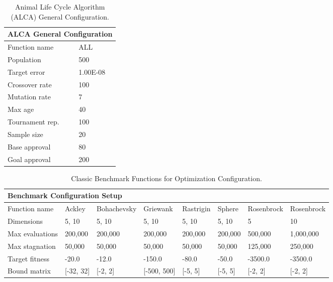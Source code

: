 \documentclass[graybox]{svmult}
\begin{document}
        \begin{table}[]
            \scriptsize
            \centering
            \caption{Animal Life Cycle Algorithm (ALCA) General Configuration.}\label{tab.general_configuration}
            \begin{tabular}{@{}ll@{}}
            \toprule
            \multicolumn{2}{l}{\textbf{ALCA General Configuration}} \\ \midrule
            Function name & ALL \\
            Population & 500 \\
            Target error & 1.00E-08 \\
            Crossover rate & 100 \\
            Mutation rate & 7 \\
            Max age & 40 \\
            Tournament rep. & 100 \\
            Sample size & 20 \\
            Base approval & 80 \\
            Goal approval & 200 \\ \bottomrule
            \end{tabular}
            \end{table}

        \begin{table}[]
            \scriptsize
            \centering
            \caption{Classic Benchmark Functions for Optimization Configuration.}\label{tab.benchmark_fun_config}
            \begin{tabular}{@{}llllllll@{}}
            \toprule
            \multicolumn{8}{l}{\textbf{Benchmark Configuration Setup}} \\ \midrule
            Function name & Ackley & Bohachevsky & Griewank & Rastrigin & Sphere & Rosenbrock & Rosenbrock \\
            Dimensions & 5, 10 & 5, 10 & 5, 10 & 5, 10 & 5, 10 & 5 & 10 \\
            Max evaluations & 200,000 & 200,000 & 200,000 & 200,000 & 200,000 & 500,000 & 1,000,000 \\
            Max stagnation & 50,000 & 50,000 & 50,000 & 50,000 & 50,000 & 125,000 & 250,000 \\
            Target fitness & -20.0 & -12.0 & -150.0 & -80.0 & -50.0 & -3500.0 & -3500.0 \\
            Bound matrix & {[}-32, 32{]} & {[}-2, 2{]} & {[}-500, 500{]} & {[}-5, 5{]} & {[}-5, 5{]} & {[}-2, 2{]} & {[}-2, 2{]} \\ \bottomrule
            \end{tabular}
            \end{table}
\end{document}
